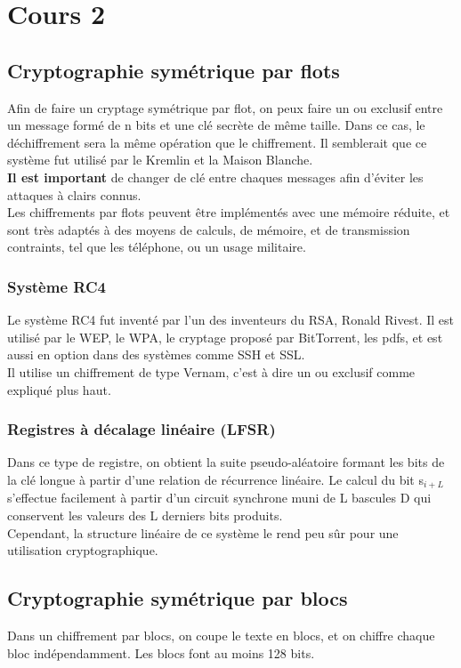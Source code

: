 \section{Cours 2}
\subsection{Cryptographie symétrique par flots}
Afin de faire un cryptage symétrique par flot, on peux faire un ou exclusif entre un message formé de n bits et une clé
secrète de même taille. Dans ce cas, le déchiffrement sera la même opération que le chiffrement. Il semblerait que ce
système fut utilisé par le Kremlin et la Maison Blanche.\\
\textbf{Il est important} de changer de clé entre chaques messages afin d'éviter les attaques à clairs connus.\\
Les chiffrements par flots peuvent être implémentés avec une mémoire réduite, et sont très adaptés à des moyens de
calculs, de mémoire, et de transmission contraints, tel que les téléphone, ou un usage militaire.

\subsubsection{Système RC4}
Le système RC4 fut inventé par l'un des inventeurs du RSA, Ronald Rivest. Il est utilisé par le WEP, le WPA, le cryptage
proposé par BitTorrent, les pdfs, et est aussi en option dans des systèmes comme SSH et SSL.\\
Il utilise un chiffrement de type Vernam, c'est à dire un ou exclusif comme expliqué plus haut.

\subsubsection{Registres à décalage linéaire (LFSR)}
Dans ce type de registre, on obtient la suite pseudo-aléatoire formant les bits de la clé longue à partir d'une relation
de récurrence linéaire. Le calcul du bit s$_{i+L}$ s'effectue facilement à partir d'un circuit synchrone muni de L
bascules D qui conservent les valeurs des L derniers bits produits.\\
Cependant, la structure linéaire de ce système le rend peu sûr pour une utilisation cryptographique.

\subsection{Cryptographie symétrique par blocs}
Dans un chiffrement par blocs, on coupe le texte en blocs, et on chiffre chaque bloc indépendamment. Les blocs font au
moins 128 bits.

